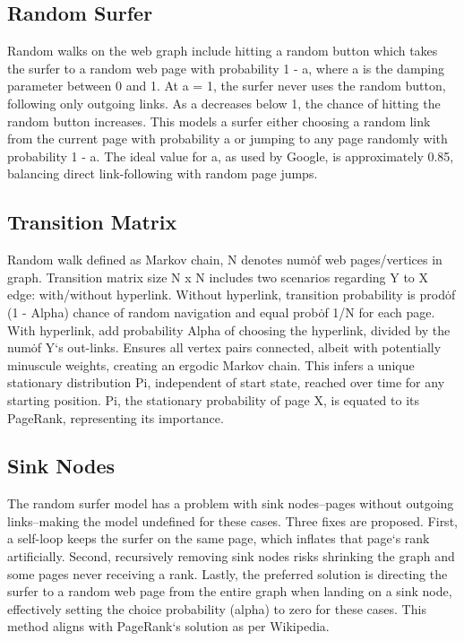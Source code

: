 \subsection*{Random Surfer}
Random walks on the web graph include hitting a random button which takes the surfer to a random web page with probability 1 - a, where a is the damping parameter between 0 and 1.
At a = 1, the surfer never uses the random button, following only outgoing links.
As a decreases below 1, the chance of hitting the random button increases.
This models a surfer either choosing a random link from the current page with probability a or jumping to any page randomly with probability 1 - a.
The ideal value for a, as used by Google, is approximately 0.85, balancing direct link-following with random page jumps.

\subsection*{Transition Matrix}
Random walk defined as Markov chain, N denotes num\. of web pages/vertices in graph.
Transition matrix size N x N includes two scenarios regarding Y to X edge: with/without hyperlink.
Without hyperlink, transition probability is prod\. of (1 - Alpha) chance of random navigation and equal prob\. of 1/N for each page.
With hyperlink, add probability Alpha of choosing the hyperlink, divided by the num\. of Y`s out-links.
Ensures all vertex pairs connected, albeit with potentially minuscule weights, creating an ergodic Markov chain.
This infers a unique stationary distribution Pi, independent of start state, reached over time for any starting position.
Pi, the stationary probability of page X, is equated to its PageRank, representing its importance.

\subsection*{Sink Nodes}
The random surfer model has a problem with sink nodes--pages without outgoing links--making the model undefined for these cases.
Three fixes are proposed.
First, a self-loop keeps the surfer on the same page, which inflates that page`s rank artificially.
Second, recursively removing sink nodes risks shrinking the graph and some pages never receiving a rank.
Lastly, the preferred solution is directing the surfer to a random web page from the entire graph when landing on a sink node, effectively setting the choice probability (alpha) to zero for these cases.
This method aligns with PageRank`s solution as per Wikipedia.

